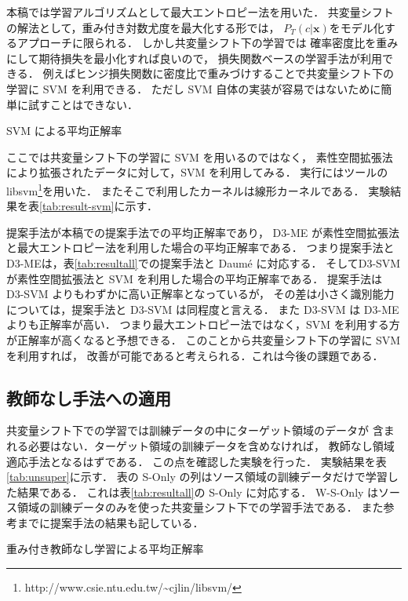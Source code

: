 \documentclass[japanese]{jnlp_1.4}
\begin{document}
本稿では学習アルゴリズムとして最大エントロピー法を用いた．
共変量シフトの解法として，重み付き対数尤度を最大化する形では，
\( P_T(c|\boldsymbol{x}) \)をモデル化するアプローチに限られる．
しかし共変量シフト下の学習では
確率密度比を重みにして期待損失を最小化すれば良いので，
損失関数ベースの学習手法が利用できる．
例えばヒンジ損失関数に密度比で重みづけすることで共変量シフト下の学習に
SVM を利用できる\cite{sugiyama-book}．
ただし SVM 自体の実装が容易ではないために簡単に試すことはできない．

\begin{table}[b]
\caption{SVM による平均正解率}
\label{tab:result-svm}

\end{table}

ここでは共変量シフト下の学習に SVM を用いるのではなく，
素性空間拡張法により拡張されたデータに対して，SVM を利用してみる．
実行にはツールの libsvm\footnote{http://www.csie.ntu.edu.tw/\~{}cjlin/libsvm/}を用いた．
またそこで利用したカーネルは線形カーネルである．
実験結果を\mbox{表\ref{tab:result-svm}}に示す．

提案手法が本稿での提案手法での平均正解率であり，
D3-ME が素性空間拡張法と最大エントロピー法を利用した場合の平均正解率である．
つまり提案手法とD3-MEは，\mbox{表\ref{tab:resultall}}での提案手法と
Daum{\'e} に対応する．
そしてD3-SVM が素性空間拡張法と SVM を利用した場合の平均正解率である．
提案手法は D3-SVM よりもわずかに高い正解率となっているが，
その差は小さく識別能力については，提案手法と D3-SVM は同程度と言える．
また D3-SVM は  D3-ME よりも正解率が高い．
つまり最大エントロピー法ではなく，SVM を利用する方が正解率が高くなると予想できる．
このことから共変量シフト下の学習に SVM を利用すれば，
改善が可能であると考えられる．これは今後の課題である．


\subsection{教師なし手法への適用}

共変量シフト下での学習では訓練データの中にターゲット領域のデータが
含まれる必要はない．ターゲット領域の訓練データを含めなければ，
教師なし領域適応手法となるはずである．
この点を確認した実験を行った．
実験結果を\mbox{表\ref{tab:unsuper}}に示す．
表の S-Only の列はソース領域の訓練データだけで学習した結果である．
これは\mbox{表\ref{tab:resultall}}の S-Only に対応する．
W-S-Only はソース領域の訓練データのみを使った共変量シフト下での学習手法である．
また参考までに提案手法の結果も記している．

\begin{table}[b]
\caption{重み付き教師なし学習による平均正解率}
\label{tab:unsuper}

\end{table}
\end{document}
